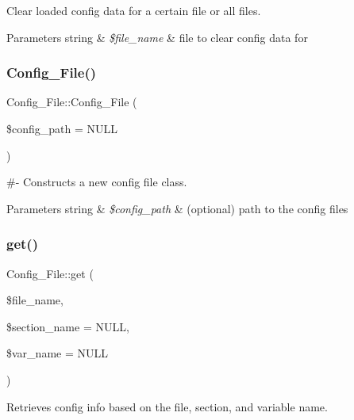 Clear loaded config data for a certain file or all files.


\begin{DoxyParams}[1]{Parameters}
string & {\em \$file\+\_\+name} & file to clear config data for \\
\hline
\end{DoxyParams}
\mbox{\label{class_config___file_a0624e75e6994282d283875ba5fe6dc50}} 
\subsubsection{\texorpdfstring{Config\+\_\+\+File()}{Config\_File()}}
{\footnotesize\ttfamily Config\+\_\+\+File\+::\+Config\+\_\+\+File (\begin{DoxyParamCaption}\item[{}]{\$config\+\_\+path = {\ttfamily NULL} }\end{DoxyParamCaption})}

\#-\/ Constructs a new config file class.


\begin{DoxyParams}[1]{Parameters}
string & {\em \$config\+\_\+path} & (optional) path to the config files \\
\hline
\end{DoxyParams}
\mbox{\label{class_config___file_adfcb0335a75e1e8d12e54d6bbe029bd6}} 
\subsubsection{\texorpdfstring{get()}{get()}}
{\footnotesize\ttfamily Config\+\_\+\+File\+::get (\begin{DoxyParamCaption}\item[{}]{\$file\+\_\+name,  }\item[{}]{\$section\+\_\+name = {\ttfamily NULL},  }\item[{}]{\$var\+\_\+name = {\ttfamily NULL} }\end{DoxyParamCaption})}

Retrieves config info based on the file, section, and variable name.


